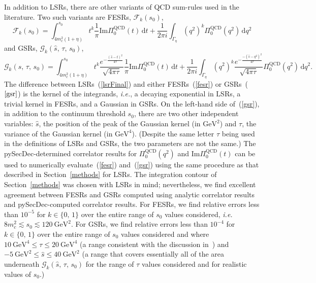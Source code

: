 \documentclass[12pt, letterpaper]{article}
\renewcommand{\Im}{\mathrm{Im}}
\newcommand{\dt}{\mathrm{d}t}
\newcommand{\dqsq}{\mathrm{d}q^2}
\newcommand{\fesr}{\mathcal{F}}
\newcommand{\gsr}{\mathcal{G}}
\newcommand{\gev}{\ensuremath{\text{GeV}}}
\newcommand{\ie}{\textit{i.e.}}
\newcommand{\add}[1]{#1}
\begin{document}
\add{
In addition to LSRs, there are other variants of QCD sum-rules
used in the literature.  Two such variants are FESRs,
$\fesr_k(s_0)$,~\cite{Shankar:1977ap,Narison:2007spatmp}
\begin{equation}\label{fesr}
  \fesr_k(s_0) = \int_{4m_c^2(1+\eta)}^{s_0}\! t^k 
    \frac{1}{\pi}\Im\Pi_0^{\text{QCD}}(t)\,\dt
  + \frac{1}{2\pi i}\int_{\Gamma_\eta}\! \left(q^2\right)^k 
  \Pi_0^{\text{QCD}}(q^2)\,\dqsq
\end{equation}
and GSRs, $\gsr_k(\hat{s},\,\tau,\,s_0)$,~\cite{Bertlmann:1984ih,Narison:2007spatmp,Ho:2018}
\begin{equation}\label{gsr}
  \gsr_k(\hat{s},\,\tau,\,s_0) = \int_{4m_c^2(1+\eta)}^{s_0}\! t^k 
  \frac{e^{-\frac{(\hat{s}-t)^2}{4\tau}}}{\sqrt{4\pi\tau}} 
    \frac{1}{\pi}\Im\Pi_0^{\text{QCD}}(t)\,\dt
  + \frac{1}{2\pi i}\int_{\Gamma_\eta}\! \left(q^2\right)^k 
  \frac{e^{-\frac{-(\hat{s}-q^2)^2}{4\tau}}}{\sqrt{4\pi\tau}}
  \Pi_0^{\text{QCD}}(q^2)\,\dqsq.
\end{equation}
The difference between LSRs~(\ref{lsrFinal}) and either FESRs~(\ref{fesr}) 
or GSRs~($\ref{gsr}$) is the kernel of the integrands, 
\ie, a decaying exponential in LSRs, a trivial kernel in FESRs, and 
a Gaussian in GSRs.
On the left-hand side of~(\ref{gsr}), in addition to the continuum threshold $s_0$, 
there are two other independent variables: $\hat{s}$, the position of the 
peak of the Gaussian kernel (in $\gev^2$)
and $\tau$, the variance of the Gaussian kernel (in $\gev^4$).
(Despite the same letter $\tau$ being used in the definitions
of LSRs and GSRs, the two parameters are not the same.)
The pySecDec-determined correlator results for $\Pi_0^{\text{QCD}}(q^2)$
and $\Im\Pi_0^{\text{QCD}}(t)$
can be used to numerically evaluate~(\ref{fesr}) and~(\ref{gsr}) using the same
procedure as that described in Section~\ref{methods} for LSRs.
The integration contour of Section~\ref{methods} was chosen with LSRs in mind;  
nevertheless, we find excellent agreement between FESRs and GSRs computed using
analytic correlator results and pySecDec-computed correlator results.
For FESRs, we find relative errors less than $10^{-5}$ for $k\in\{0,\,1\}$ over 
the entire range of $s_0$ values considered, \ie\ $8m_c^2\lesssim s_0\lesssim 120~\gev^2$.
For GSRs, we find relative errors less than $10^{-4}$ for $k\in\{0,\,1\}$ over 
the entire range of $s_0$ values considered and where 
$10\ \gev^4\leq\tau\leq 20\ \gev^4$ (a range consistent with the discussion
in~\cite{Ho:2018}) and
$-5\ \gev^2\leq\hat{s}\leq 40\ \gev^2$ (a range that covers essentially all of
the area underneath $\gsr_k(\hat{s},\,\tau,\,s_0)$ for the range of $\tau$ values 
considered and for realistic values of $s_0$.)
}
\end{document}
